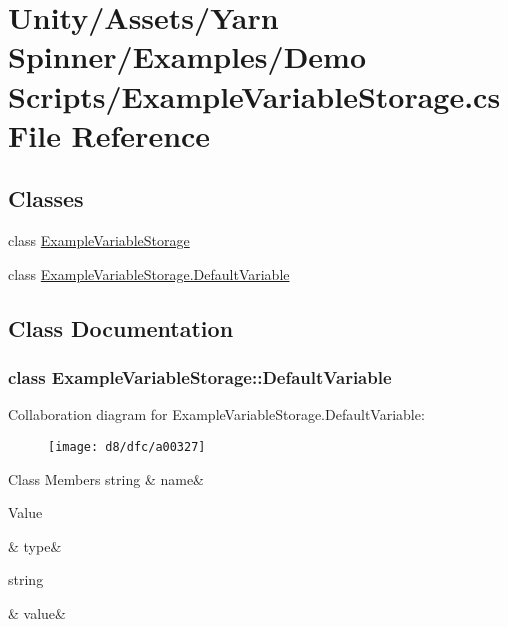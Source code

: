 \hypertarget{a00258}{\section{Unity/\-Assets/\-Yarn Spinner/\-Examples/\-Demo Scripts/\-Example\-Variable\-Storage.cs File Reference}
\label{a00258}
}
\subsection*{Classes}
\begin{DoxyCompactItemize}
\item 
class \hyperlink{a00069}{Example\-Variable\-Storage}
\item 
class \hyperlink{a00069_da/de0/a00317}{Example\-Variable\-Storage.\-Default\-Variable}
\end{DoxyCompactItemize}


\subsection{Class Documentation}
\label{da/de0/a00317}
\hypertarget{a00069_da/de0/a00317}{}
\subsubsection{class Example\-Variable\-Storage\-:\-:Default\-Variable}


Collaboration diagram for Example\-Variable\-Storage.\-Default\-Variable\-:
\nopagebreak
\begin{figure}[H]
\begin{center}
\leavevmode
\texttt{[image: d8/dfc/a00327]}
\end{center}
\end{figure}
\begin{DoxyFields}{Class Members}
\hypertarget{a00069_a609feaa53936e7dc42248ff2ba68454a}{string}\label{a00069_a609feaa53936e7dc42248ff2ba68454a}
&
name&
\\
\hline

\hypertarget{a00069_a904347efdca12f40243c7dedb646153d}{Value}\label{a00069_a904347efdca12f40243c7dedb646153d}
&
type&
\\
\hline

\hypertarget{a00069_a0f00ecb21b58aa754a4bbb61edf62818}{string}\label{a00069_a0f00ecb21b58aa754a4bbb61edf62818}
&
value&
\\
\hline

\end{DoxyFields}
